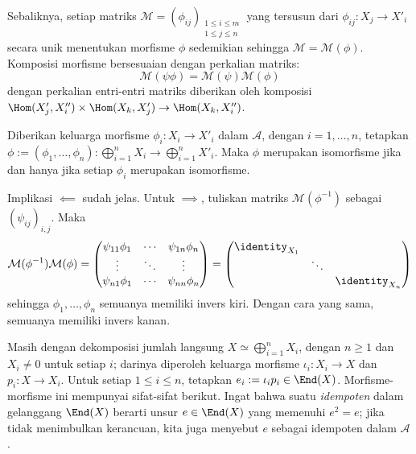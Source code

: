 Sebaliknya, setiap matriks $\mathcal{M} = (\phi_{ij})_{\substack{ 1 \leq i \leq m \\ 1 \leq j \leq n }}$
yang tersusun dari $\phi_{ij}: X_j \to X'_i$ secara unik menentukan morfisme
$\phi$ sedemikian sehingga $\mathcal{M}=\mathcal{M}(\phi)$. Komposisi morfisme
bersesuaian dengan perkalian matriks:
\[ \mathcal{M}(\psi\phi) = \mathcal{M}(\psi) \mathcal{M}(\phi) \]
dengan perkalian entri-entri matriks diberikan oleh komposisi
$\Hom(X'_j, X''_i) \times \Hom(X_k, X'_j) \to \Hom(X_k, X''_i)$.

\begin{lema}\label{prop:isomorphism-matrix}
	Diberikan keluarga morfisme $\phi_i:X_i\to X'_i$ dalam $\mathcal{A}$,
	dengan $i=1,\ldots,n$, tetapkan
	$\phi := (\phi_1, \ldots, \phi_n): \bigoplus_{i=1}^n X_i \to
	\bigoplus_{i=1}^n X'_i$. Maka $\phi$ merupakan isomorfisme jika dan hanya
	jika setiap $\phi_i$ merupakan isomorfisme.
\end{lema}
\begin{bukti}
	Implikasi $\impliedby$ sudah jelas. Untuk $\implies$, tuliskan matriks
	$\mathcal{M}(\phi^{-1})$ sebagai $(\psi_{ij})_{i,j}$. Maka
	\[ \mathcal{M}(\phi^{-1}) \mathcal{M}(\phi) = \begin{pmatrix}
		\psi_{11} \phi_1 & \cdots & \psi_{1n} \phi_n \\
		\vdots & \ddots & \vdots \\
		\psi_{n1} \phi_1 & \cdots & \psi_{nn} \phi_n
	\end{pmatrix} = \begin{pmatrix}
		\identity_{X_1} & & \\
		& \ddots & \\
		& & \identity_{X_n}
	\end{pmatrix}\]
	sehingga $\phi_1,\ldots,\phi_n$ semuanya memiliki invers kiri. Dengan cara
	yang sama, semuanya memiliki invers kanan.
\end{bukti}

Masih dengan dekomposisi jumlah langsung
$X \simeq \bigoplus_{i=1}^n X_i$, dengan $n\geq 1$ dan
$X_i\neq 0$ untuk setiap $i$; darinya diperoleh keluarga morfisme
$\iota_i:X_i\to X$ dan $p_i:X\to X_i$. Untuk setiap $1\leq i\leq n$,
tetapkan $e_i:=\iota_i p_i\in\End(X)$. Morfisme-morfisme ini mempunyai
sifat-sifat berikut. Ingat bahwa suatu \emph{idempoten} dalam gelanggang
$\End(X)$ berarti unsur $e\in\End(X)$ yang memenuhi $e^2=e$; jika tidak
menimbulkan kerancuan, kita juga menyebut $e$ sebagai idempoten dalam
$\mathcal{A}$.

